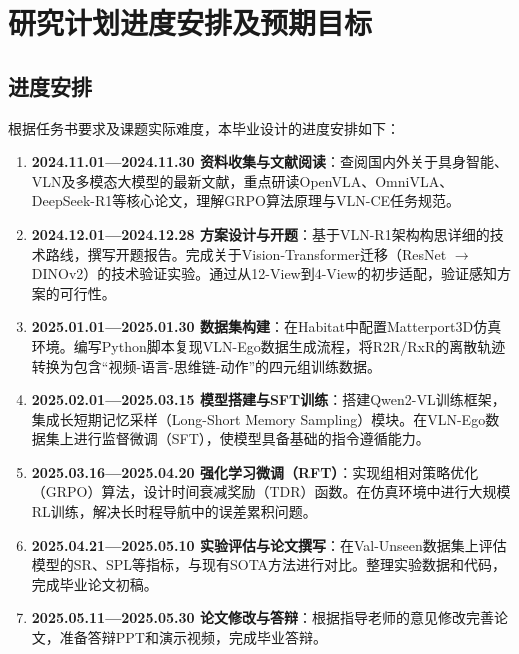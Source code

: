 \section{研究计划进度安排及预期目标}

\subsection{进度安排}
根据任务书要求及课题实际难度，本毕业设计的进度安排如下：
\begin{enumerate}
    \item \textbf{2024.11.01—2024.11.30 资料收集与文献阅读}：查阅国内外关于具身智能、VLN及多模态大模型的最新文献，重点研读OpenVLA、OmniVLA、DeepSeek-R1等核心论文，理解GRPO算法原理与VLN-CE任务规范。
    \item \textbf{2024.12.01—2024.12.28 方案设计与开题}：基于VLN-R1架构构思详细的技术路线，撰写开题报告。完成关于Vision-Transformer迁移（ResNet $\to$ DINOv2）的技术验证实验。通过从12-View到4-View的初步适配，验证感知方案的可行性。
    \item \textbf{2025.01.01—2025.01.30 数据集构建}：在Habitat中配置Matterport3D仿真环境。编写Python脚本复现VLN-Ego数据生成流程，将R2R/RxR的离散轨迹转换为包含“视频-语言-思维链-动作”的四元组训练数据。
    \item \textbf{2025.02.01—2025.03.15 模型搭建与SFT训练}：搭建Qwen2-VL训练框架，集成长短期记忆采样（Long-Short Memory Sampling）模块。在VLN-Ego数据集上进行监督微调（SFT），使模型具备基础的指令遵循能力。
    \item \textbf{2025.03.16—2025.04.20 强化学习微调（RFT）}：实现组相对策略优化（GRPO）算法，设计时间衰减奖励（TDR）函数。在仿真环境中进行大规模RL训练，解决长时程导航中的误差累积问题。
    \item \textbf{2025.04.21—2025.05.10 实验评估与论文撰写}：在Val-Unseen数据集上评估模型的SR、SPL等指标，与现有SOTA方法进行对比。整理实验数据和代码，完成毕业论文初稿。
    \item \textbf{2025.05.11—2025.05.30 论文修改与答辩}：根据指导老师的意见修改完善论文，准备答辩PPT和演示视频，完成毕业答辩。
\end{enumerate}

